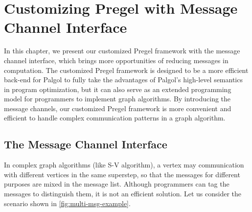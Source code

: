\documentclass{sokendai_thesis} %
\begin{document}
\chapter{Customizing Pregel with Message Channel Interface}
\label{sec:customized}

In this chapter, we present our customized Pregel framework with the message channel interface, which brings more opportunities of reducing messages in computation.
The customized Pregel framework is designed to be a more efficient back-end for Palgol to fully take the advantages of Palgol's high-level semantics in program optimization, but it can also serve as an extended programming model for programmers to implement graph algorithms.
By introducing the message channels, our customized Pregel framework is more convenient and efficient to handle complex communication patterns in a graph algorithm.

\section{The Message Channel Interface}

In complex graph algorithms (like S-V algorithm), a vertex may communication with different vertices in the same superstep, so that the messages for different purposes are mixed in the message list.
Although programmers can tag the messages to distinguish them, it is not an efficient solution.
Let us consider the scenario shown in \autoref{fig:multi-msg-example}.
\end{document}

